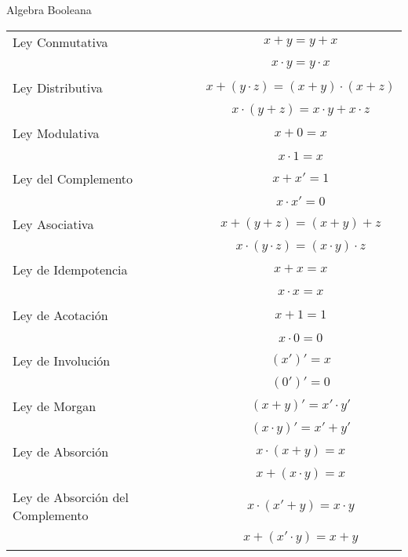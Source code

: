 \documentclass[a4paper,12pt]{article}
\begin{document}
\thispagestyle{empty}
\begin{flushleft}
Algebra Booleana\\
\begin{tabular}[t]{|l|c|}
\hline
Ley Conmutativa & $x+y=y+x$ \\
\ & $x\cdot y=y\cdot x$ \\
\hline
Ley Distributiva & $x+(y\cdot z) = (x+y)\cdot(x+z)$ \\
\ & $x\cdot(y+z) = x\cdot y+x\cdot z$ \\
\hline
Ley Modulativa & $x+0 = x$ \\
\ & $x\cdot 1=x$ \\
\hline
Ley del Complemento & $x+x'=1$ \\
\ & $x\cdot x'=0$ \\
\hline
Ley Asociativa & $x+(y+z)=(x+y)+z$ \\
\ & $x\cdot(y\cdot z)=(x\cdot y)\cdot z$ \\
\hline
Ley de Idempotencia & $x+x=x$ \\
\ & $x\cdot x=x$ \\
\hline
Ley de Acotación & $x+1=1$ \\
\ & $x\cdot 0=0$ \\
\hline
Ley de Involución & $(x')'=x$ \\
\ & $(0')'=0$ \\
\hline
Ley de Morgan & $(x+y)'=x' \cdot y'$ \\
\ & $(x\cdot y)' = x' + y'$ \\
\hline
Ley de Absorción & $x\cdot(x+y)=x$ \\
\ & $x+(x\cdot y)=x$ \\
\hline
Ley de Absorción del Complemento & $x\cdot(x'+y)=x\cdot y$ \\
\ & $x+(x' \cdot y	)=x+y$ \\
\hline
\end{tabular}
\end{flushleft}
\end{document}

